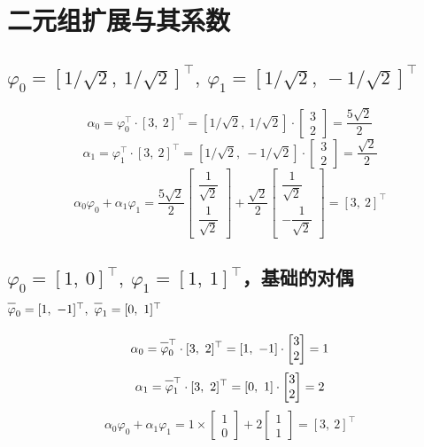 \documentclass{article}
\newcommand{\barline}[1]{\overline{#1\rule{0pt}{1.5ex}}}
\begin{document}
\section{二元组扩展与其系数}
\subsection{$\varphi_0=[1/\sqrt{2},\ 1/\sqrt{2}]^{\top},\ \varphi_1=[1/\sqrt{2},\ -1/\sqrt{2}]^{\top}$}
\[ \alpha_0=\varphi_0^{\top}\cdot[3,\ 2]^{\top}=[1/\sqrt{2},\ 1/\sqrt{2}]\cdot\left[\begin{matrix}
    3
    \\
    2
\end{matrix}\right]=\dfrac{5\sqrt{2}}{2} \]
\[ \alpha_1=\varphi_1^{\top}\cdot[3,\ 2]^{\top}=[1/\sqrt{2},\ -1/\sqrt{2}]\cdot\left[\begin{matrix}
    3
    \\
    2
\end{matrix}\right]=\dfrac{\sqrt{2}}{2} \]
\[ \alpha_0\varphi_0+\alpha_1\varphi_1=\dfrac{5\sqrt{2}}{2}\left[\begin{matrix}
    \dfrac{1}{\sqrt{2}}
    \\[10pt]
    \dfrac{1}{\sqrt{2}}
\end{matrix}\right]+\dfrac{\sqrt{2}}{2}\left[\begin{matrix}
    \dfrac{1}{\sqrt{2}}
    \\[10pt]
    -\dfrac{1}{\sqrt{2}}
\end{matrix}\right]=[3,\ 2]^{\top} \]



\subsection{$\varphi_0=[1,\ 0]^{\top},\ \varphi_1=[1,\ 1]^{\top}$，基础的对偶 $\barline{\varphi}_0=[1,\ -1]^{\top},\ \barline{\varphi}_1=[0,\ 1]^{\top}$}
\[ \alpha_0=\barline{\varphi}_0^{\top}\cdot[3,\ 2]^{\top}=[1,\ -1]\cdot\left[\begin{matrix}
    3
    \\
    2
\end{matrix}\right]=1 \]
\[ \alpha_1=\barline{\varphi}_1^{\top}\cdot[3,\ 2]^{\top}=[0,\ 1]\cdot\left[\begin{matrix}
    3
    \\
    2
\end{matrix}\right]=2 \]
\[ \alpha_0\varphi_0+\alpha_1\varphi_1=1\times\left[\begin{matrix}
    1
    \\[10pt]
    0
\end{matrix}\right]+2\left[\begin{matrix}
    1
    \\[10pt]
    1
\end{matrix}\right]=[3,\ 2]^{\top} \]
\end{document}

